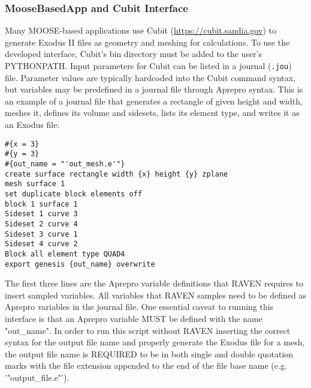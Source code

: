 \subsubsection{MooseBasedApp and Cubit Interface}
Many MOOSE-based applications use Cubit (\url{https://cubit.sandia.gov}) to generate Exodus II files as
geometry and meshing for calculations.  To use the developed interface, Cubit's
bin directory must be added to the user's PYTHONPATH.  Input parameters for Cubit can be listed in a journal
(\texttt{.jou}) file.  Parameter values
are typically hardcoded into the Cubit command syntax, but variables may be
predefined in a journal file through Aprepro syntax.  This is an example of a journal
file that generates a rectangle of given height and width, meshes it, defines its
volume and sidesets, lists its element type, and writes it as an Exodus file:


\begin{lstlisting}
#{x = 3}
#{y = 3}
#{out_name = "'out_mesh.e'"}
create surface rectangle width {x} height {y} zplane
mesh surface 1
set duplicate block elements off
block 1 surface 1
Sideset 1 curve 3
Sideset 2 curve 4
Sideset 3 curve 1
Sideset 4 curve 2
Block all element type QUAD4
export genesis {out_name} overwrite
\end{lstlisting}

The first three lines are the Aprepro variable definitions that RAVEN requires to
insert sampled variables.  All variables that RAVEN samples
need to be defined as Aprepro variables in the journal
file.
One essential caveat to running
this interface is that an Aprepro variable MUST be defined with the name "out\_name".
In order to run this script without RAVEN inserting the correct syntax for the
output file name and properly generate the Exodus file for a mesh, the output file
name is REQUIRED to be in both single and double quotation marks with the file
extension appended to the end of the file base name (e.g. '"output\_file.e"').

